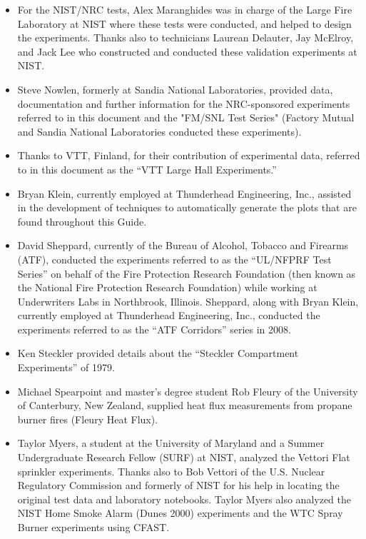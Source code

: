 \documentclass[12pt]{book}
\begin{document}
\begin{itemize}
\item For the NIST/NRC tests, Alex Maranghides was in charge of the Large Fire Laboratory at NIST where these tests were conducted, and helped to design the experiments. Thanks also to technicians Laurean Delauter, Jay McElroy, and Jack Lee who constructed and conducted these validation experiments at NIST.

\item Steve Nowlen, formerly at Sandia National Laboratories, provided data, documentation and further information for the NRC-sponsored experiments referred to in this document and the "FM/SNL Test Series" (Factory Mutual and Sandia National Laboratories conducted these experiments).

\item Thanks to VTT, Finland, for their contribution of experimental data, referred to in this document as the ``VTT Large Hall Experiments.''

\item Bryan Klein, currently employed at Thunderhead Engineering, Inc., assisted in the development of techniques to automatically generate the plots that are found throughout this Guide.

\item David Sheppard, currently of the Bureau of Alcohol, Tobacco and Firearms (ATF), conducted the experiments referred to as the ``UL/NFPRF Test Series'' on behalf of the Fire Protection Research Foundation (then known as the National Fire Protection Research Foundation) while working at Underwriters Labs in Northbrook, Illinois. Sheppard, along with Bryan Klein, currently employed at Thunderhead Engineering, Inc., conducted the experiments referred to as the ``ATF Corridors'' series in 2008.

\item Ken Steckler provided details about the ``Steckler Compartment Experiments'' of 1979.

\item Michael Spearpoint and master's degree student Rob Fleury of the University of Canterbury, New Zealand, supplied heat flux measurements from propane burner fires (Fleury Heat Flux).

\item Taylor Myers, a student at the University of Maryland and a Summer Undergraduate Research Fellow (SURF) at NIST, analyzed the Vettori Flat sprinkler experiments. Thanks also to Bob Vettori of the U.S. Nuclear Regulatory Commission and formerly of NIST for his help in locating the original test data and laboratory notebooks. Taylor Myers also analyzed the NIST Home Smoke Alarm (Dunes 2000) experiments and the WTC Spray Burner experiments using CFAST.


\end{itemize}
\end{document}
